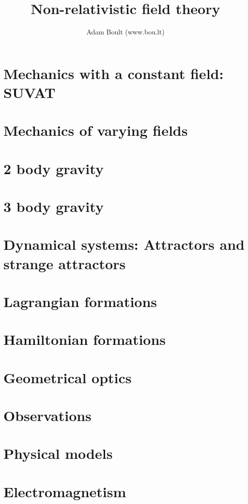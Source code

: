 \documentclass[oneside]{book}
\begin{document}
\author{Adam Boult (www.bou.lt)}
\title{Non-relativistic field theory}
\maketitle

\setcounter{tocdepth}{0}
\tableofcontents



\part{Mechanics with a constant field: SUVAT}


\part{Mechanics of varying fields}




\part{2 body gravity}

\part{3 body gravity}

\part{Dynamical systems: Attractors and strange attractors}

\part{Lagrangian formations}

\part{Hamiltonian formations}


\part{Geometrical optics}

\part{Observations}

\part{Physical models}






\part{Electromagnetism}

\end{document}

